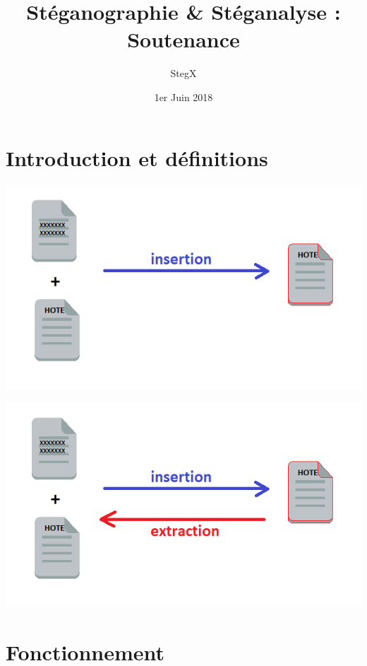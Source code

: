 \documentclass{beamer}
\title{Stéganographie \& Stéganalyse : Soutenance}
\author{StegX}
\institute{UFR des Sciences Versailles - L3 Informatique}
\date{1er Juin 2018}
\begin{document}
  \begin{frame}
  \titlepage
  \end{frame}
  
  \section{Introduction et définitions}
  
  \begin{frame}
  \hspace{5cm}
  \includegraphics[scale=0.7]{pictures/definition1.png}
  \end{frame}
  
  \begin{frame}
  \hspace{5cm}
  \includegraphics[scale=0.7]{pictures/definition2.png}
  \end{frame}
  
  
  \section{Fonctionnement} 
  
\end{document}
